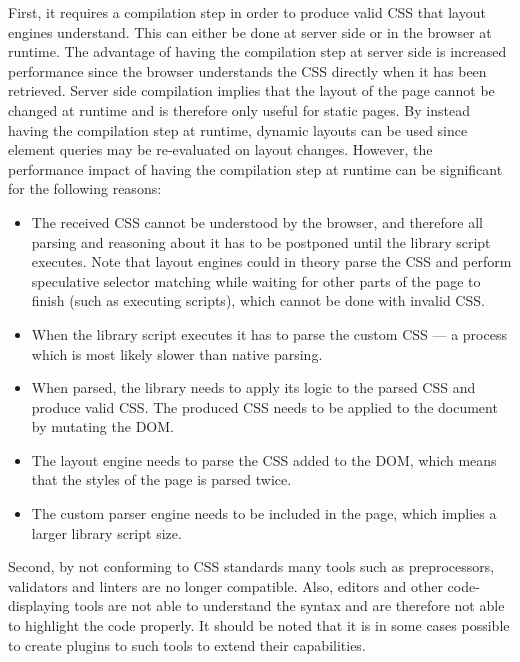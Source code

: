 \documentclass[a4paper,11pt]{kth-mag}
\begin{document}
    First, it requires a compilation step in order to produce valid \gls{CSS} that \glspl{layout engine} understand.
    This can either be done at server side or in the \gls{browser} at runtime.
    The advantage of having the compilation step at server side is increased performance since the \gls{browser} understands the \gls{CSS} directly when it has been retrieved.
    Server side compilation implies that the layout of the page cannot be changed at runtime and is therefore only useful for static pages.
    By instead having the compilation step at runtime, dynamic layouts can be used since element queries may be re-evaluated on layout changes.
    However, the performance impact of having the compilation step at runtime can be significant for the following reasons:
    \begin{itemize}
      \item The received \gls{CSS} cannot be understood by the \gls{browser}, and therefore all parsing and reasoning about it has to be postponed until the library script executes.
      Note that \glspl{layout engine} could in theory parse the \gls{CSS} and perform speculative selector matching while waiting for other parts of the page to finish (such as executing scripts), which cannot be done with invalid \gls{CSS}.
      \item When the library script executes it has to parse the custom \gls{CSS} --- a process which is most likely slower than \gls{native} parsing.
      \item When parsed, the library needs to apply its logic to the parsed \gls{CSS} and produce valid \gls{CSS}. The produced \gls{CSS} needs to be applied to the \gls{document} by mutating the \gls{DOM}.
      \item The \gls{layout engine} needs to parse the \gls{CSS} added to the \gls{DOM}, which means that the styles of the page is parsed twice.
      \item The custom parser engine needs to be included in the page, which implies a larger library script size.
    \end{itemize}
    
    Second, by not conforming to \gls{CSS} standards many tools such as preprocessors, validators and linters are no longer compatible.
    Also, editors and other code-displaying tools are not able to understand the syntax and are therefore not able to highlight the code properly.
    It should be noted that it is in some cases possible to create plugins to such tools to extend their capabilities.
\end{document}
